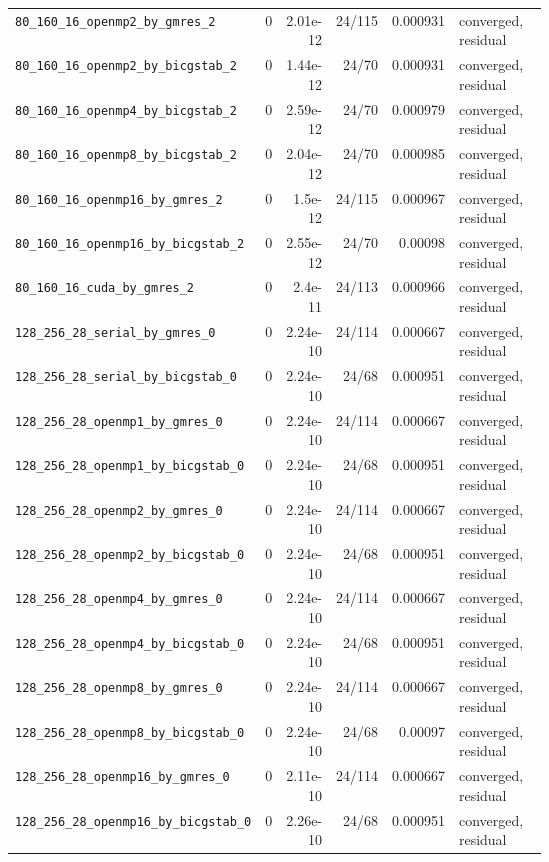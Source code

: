 \documentclass[11pt]{article}
\begin{document}
\begin{longtable}{p{0.40\linewidth}rrrrp{0.22\linewidth}}
\nolinkurl{80_160_16_openmp2_by_gmres_2} & 0 & 2.01e-12 & 24/115 & 0.000931 & converged, residual\\
\nolinkurl{80_160_16_openmp2_by_bicgstab_2} & 0 & 1.44e-12 & 24/70 & 0.000931 & converged, residual\\
\nolinkurl{80_160_16_openmp4_by_bicgstab_2} & 0 & 2.59e-12 & 24/70 & 0.000979 & converged, residual\\
\nolinkurl{80_160_16_openmp8_by_bicgstab_2} & 0 & 2.04e-12 & 24/70 & 0.000985 & converged, residual\\
\nolinkurl{80_160_16_openmp16_by_gmres_2} & 0 & 1.5e-12 & 24/115 & 0.000967 & converged, residual\\
\nolinkurl{80_160_16_openmp16_by_bicgstab_2} & 0 & 2.55e-12 & 24/70 & 0.00098 & converged, residual\\
\nolinkurl{80_160_16_cuda_by_gmres_2} & 0 & 2.4e-11 & 24/113 & 0.000966 & converged, residual\\
\nolinkurl{128_256_28_serial_by_gmres_0} & 0 & 2.24e-10 & 24/114 & 0.000667 & converged, residual\\
\nolinkurl{128_256_28_serial_by_bicgstab_0} & 0 & 2.24e-10 & 24/68 & 0.000951 & converged, residual\\
\nolinkurl{128_256_28_openmp1_by_gmres_0} & 0 & 2.24e-10 & 24/114 & 0.000667 & converged, residual\\
\nolinkurl{128_256_28_openmp1_by_bicgstab_0} & 0 & 2.24e-10 & 24/68 & 0.000951 & converged, residual\\
\nolinkurl{128_256_28_openmp2_by_gmres_0} & 0 & 2.24e-10 & 24/114 & 0.000667 & converged, residual\\
\nolinkurl{128_256_28_openmp2_by_bicgstab_0} & 0 & 2.24e-10 & 24/68 & 0.000951 & converged, residual\\
\nolinkurl{128_256_28_openmp4_by_gmres_0} & 0 & 2.24e-10 & 24/114 & 0.000667 & converged, residual\\
\nolinkurl{128_256_28_openmp4_by_bicgstab_0} & 0 & 2.24e-10 & 24/68 & 0.000951 & converged, residual\\
\nolinkurl{128_256_28_openmp8_by_gmres_0} & 0 & 2.24e-10 & 24/114 & 0.000667 & converged, residual\\
\nolinkurl{128_256_28_openmp8_by_bicgstab_0} & 0 & 2.24e-10 & 24/68 & 0.00097 & converged, residual\\
\nolinkurl{128_256_28_openmp16_by_gmres_0} & 0 & 2.11e-10 & 24/114 & 0.000667 & converged, residual\\
\nolinkurl{128_256_28_openmp16_by_bicgstab_0} & 0 & 2.26e-10 & 24/68 & 0.000951 & converged, residual\\

\end{longtable}
\end{document}
